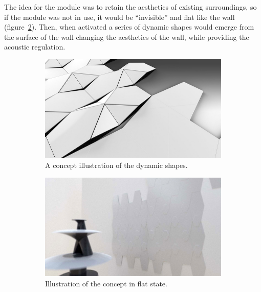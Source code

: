 The idea for the module was to retain the aesthetics of existing surroundings, so if the module was not in use, it would be ``invisible'' and flat like the wall (figure~\ref{fig:beomotion:concept_flat}). 
Then, when activated a series of dynamic shapes would emerge from the surface of the wall changing the aesthetics of the wall, while providing the acoustic regulation.

\begin{figure}[h]
	\centering
	\begin{subfigure}{.44\textwidth}
		\centering
		\includegraphics[width=\linewidth]{figures/beomotion/concept}
		\caption{A concept illustration of the dynamic shapes.}
		\label{fig:beomotion:concept}
	\end{subfigure}%
	\hspace{.02\textwidth}
	\begin{subfigure}{.44\textwidth}
		\centering
		\includegraphics[width=\linewidth]{figures/beomotion/concept_flat}
		\caption{Illustration of the concept in flat state.}
		\label{fig:beomotion:concept_flat}
	\end{subfigure}
	\begin{subfigure}{.44\textwidth}

\end{subfigure}
\end{figure}
